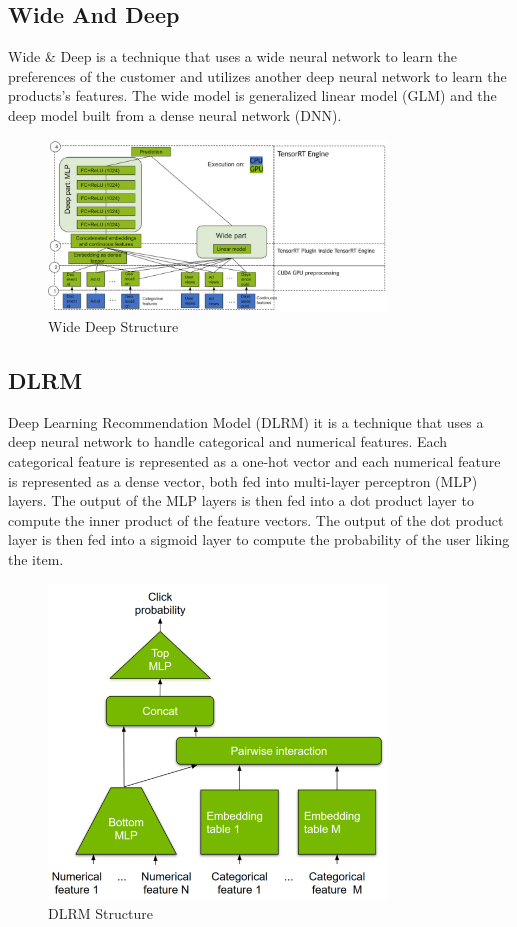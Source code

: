 \subsection{Wide And Deep}
Wide \& Deep is a technique that uses a wide neural network to learn the preferences of the customer and utilizes another deep neural network to learn the products's features. The wide model is generalized linear model (GLM) and the deep model built from a dense neural network (DNN).
\begin{figure}[H]
    \centering
    \includegraphics[width=0.8\textwidth]{assets/wide_deep.png}
    \caption[Wide Deep Structure]{Wide Deep Structure \cite{NvidiaRecSys}}
    \label{fig:wide-deep}
\end{figure}

\subsection{DLRM}
Deep Learning Recommendation Model (DLRM) it is a technique that uses a deep neural network to handle categorical and numerical features. Each categorical feature is represented as a one-hot vector and each numerical feature is represented as a dense vector, both fed into multi-layer perceptron (MLP) layers. The output of the MLP layers is then fed into a dot product layer to compute the inner product of the feature vectors. The output of the dot product layer is then fed into a sigmoid layer to compute the probability of the user liking the item.
\begin{figure}[H]
    \centering
    \includegraphics[width=0.8\textwidth]{assets/dlrm.png}
    \caption[DLRM Structure]{DLRM Structure \cite{NvidiaRecSys}}
    \label{fig:dlrm}
\end{figure}
